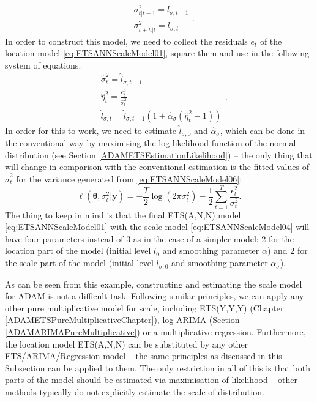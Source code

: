 \documentclass[]{book}
\theoremstyle{definition}
\theoremstyle{definition}
\theoremstyle{definition}
\theoremstyle{definition}
\theoremstyle{remark}
\begin{document}
\begin{equation}
  \begin{aligned}
    &\sigma_{t|t-1}^2 = l_{\sigma,t-1} \\
    &\sigma_{t+h|t}^2 = l_{\sigma,t} 
  \end{aligned}.
  \label{eq:ETSANNScaleModel05}
\end{equation}
In order to construct this model, we need to collect the residuals \(e_t\) of the location model \eqref{eq:ETSANNScaleModel01}, square them and use in the following system of equations:
\begin{equation}
  \begin{aligned}
    &\hat{\sigma}^2_{t} = \hat{l}_{\sigma,t-1} \\
    &\hat{\eta}_t^2 = \frac{e_t^2}{\hat{\sigma}^2_{t}} \\
    &\hat{l}_{\sigma,t} = \hat{l}_{\sigma,t-1} (1 + \hat{\alpha}_\sigma (\hat{\eta}_t^2-1))
  \end{aligned}.
  \label{eq:ETSANNScaleModel06}
\end{equation}
In order for this to work, we need to estimate \(\hat{l}_{\sigma,0}\) and \(\hat{\alpha}_\sigma\), which can be done in the conventional way by maximising the log-likelihood function of the normal distribution (see Section \ref{ADAMETSEstimationLikelihood}) -- the only thing that will change in comparison with the conventional estimation is the fitted values of \(\hat{\sigma}^2_{t}\) for the variance generated from \eqref{eq:ETSANNScaleModel06}:
\begin{equation}
    \ell(\boldsymbol{\theta}, {\sigma}_t^2 | \mathbf{y}) = -\frac{T}{2} \log(2 \pi \sigma_t^2) -\frac{1}{2} \sum_{t=1}^T \frac{\epsilon_t^2}{\sigma_t^2} .
  \label{eq:ETSANNScaleModelLogLik}
\end{equation}
The thing to keep in mind is that the final ETS(A,N,N) model \eqref{eq:ETSANNScaleModel01} with the scale model \eqref{eq:ETSANNScaleModel04} will have four parameters instead of 3 as in the case of a simpler model: 2 for the location part of the model (initial level \(l_{0}\) and smoothing parameter \(\alpha\)) and 2 for the scale part of the model (initial level \(l_{\sigma,0}\) and smoothing parameter \(\alpha_\sigma\)).

As can be seen from this example, constructing and estimating the scale model for ADAM is not a difficult task. Following similar principles, we can apply any other pure multiplicative model for scale, including ETS(Y,Y,Y) (Chapter \ref{ADAMETSPureMultiplicativeChapter}), log ARIMA (Section \ref{ADAMARIMAPureMultiplicative}) or a multiplicative regression. Furthermore, the location model ETS(A,N,N) can be substituted by any other ETS/ARIMA/Regression model -- the same principles as discussed in this Subsection can be applied to them. The only restriction in all of this is that both parts of the model should be estimated via maximisation of likelihood -- other methods typically do not explicitly estimate the scale of distribution.
\end{document}
